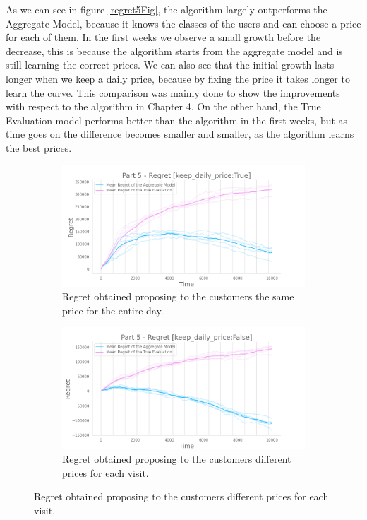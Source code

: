As we can see in figure \ref{regret5Fig}, the algorithm largely outperforms the Aggregate Model, because it knows the classes of the users and can choose a price for each of them.
In the first weeks we observe a small growth before the decrease, this is because the algorithm starts from the aggregate model and is still learning the correct prices.
We can also see that the initial growth lasts longer when we keep a daily price, because by fixing the price it takes longer to learn the curve.
This comparison was mainly done to show the improvements with respect to the algorithm in Chapter 4.
On the other hand, the True Evaluation model performs better than the algorithm in the first weeks, but as time goes on the difference becomes smaller and smaller, as the algorithm learns the best prices.

\begin{figure}[!htb]
    \centering

    \begin{subfigure}[!H]{0.8\textwidth}
        \centering
        \includegraphics[width=\textwidth]{images/part5_keep-daily-priceTrue.png}
        \caption{Regret obtained proposing to the customers the same price for the entire day.}
    \end{subfigure}

    \begin{subfigure}[!H]{0.8\textwidth}
        \centering
        \includegraphics[width=\textwidth]{images/part5_keep-daily-priceFalse.png}
        \caption{Regret obtained proposing to the customers different prices for each visit.}
    \end{subfigure}


\end{figure}
